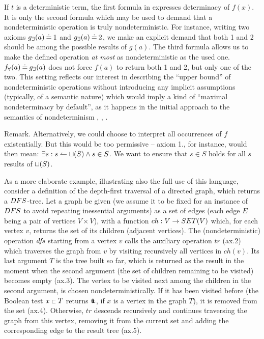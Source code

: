 If $t$ is a deterministic term, the first formula in  expresses determinacy of $f(x)$.
It is only the second formula which may be used to demand that a
nondeterministic operation is truly nondeterministic. For instance, writing
two axioms $g_\exists(a)\mathbin{\doteq} 1$ and $g_\exists(a)\mathbin{\doteq} 2$, we make an explicit demand that
both 1 and 2 should be among the possible results of $g(a)$. The third
formula allows us to make the defined operation {\em at most} as
nondeterministic as the used one. $f_\forall(a)\mathbin{\doteq} g_\exists(a)$ does not force
$f(a)$ to return both 1 and 2, but only one of the two. This setting reflects
our interest in
describing the ``upper bound'' of nondeterministic operations without
introducing any implicit assumptions (typically, of a semantic nature) which
would imply a kind of ``maximal nondeterminacy by default'', as it happens in
the initial approach to the semantics of nondeterminism \cite{HusB},
\cite{Mos}, \cite{Mes}. 
\begin{SREMARK}{Remark.}
Alternatively, we could choose to interpret all occurrences of $f$ existentially. But this would be too permissive -- axiom 1., for instance, would then mean: $\exists s: s\leftharpoonup \sqcup(S)\land s\in S$. We want to ensure that $s\in S$ holds for all $ s $ results of $\sqcup(S)$. \end{SREMARK}
As a more elaborate example, illustrating also the full use of this language, consider a definition of the depth-first traversal of a directed graph, which returns a $DFS$-tree. Let a graph be given (we assume it to be fixed for an instance of $DFS$ to avoid repeating inessential arguments) as a set of edges (each edge $E$
being a pair of vertices $V\times V$), with a function $ch:V\rightarrow SET(V)$ which, for each vertex $v$, returns the set of its children (adjacent vertices).
The (nondeterministic) operation $df\!s$ starting from a vertex $v$ calls the auxiliary operation $tr$ (ax.2) which traverses the graph from $v$ by visiting
recursively all vertices in $ch(v)$. Its last argument $T$ is the tree built so far, which is returned as the result in the moment when the second argument
(the set of children remaining to be visited) becomes empty (ax.3). The vertex to be visited next among the children in the second argument, is chosen nondeterministically. If it has been visited before (the Boolean test $x\mathrel{\scriptstyle{\sqsubset}} T$ returns ${\bf t\hspace*{-2.3 pt}t}$, if $x$ is a vertex in the graph $T$), it is removed
from the set (ax.4). Otherwise, $tr$ descends recursively and continues traversing the graph from this vertex, removing it from the current set 
and adding the corresponding edge to the result tree (ax.5). 

